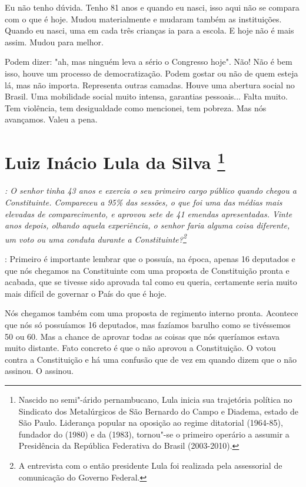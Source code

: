 Eu não tenho dúvida. Tenho 81 anos e quando eu nasci, isso
aqui não se compara com o que é hoje. Mudou materialmente e mudaram
também as instituições. Quando eu nasci, uma em cada três crianças ia
para a escola. E hoje não é mais assim. Mudou para melhor.

Podem dizer: "ah, mas ninguém leva a sério o Congresso hoje". Não! Não é
bem isso, houve um processo de democratização. Podem gostar ou não de
quem esteja lá, mas não importa. Representa outras camadas. Houve uma
abertura social no Brasil. Uma mobilidade social muito intensa,
garantias pessoais... Falta muito. Tem violência, tem desigualdade como
mencionei, tem pobreza. Mas nós avançamos. Valeu a pena.

\chapter{Luiz Inácio Lula da Silva
\footnote{Nascido no semi"-árido pernambucano, Lula inicia sua trajetória política
no Sindicato dos Metalúrgicos de São Bernardo do Campo e Diadema, estado
de São Paulo. Liderança popular na oposição ao regime ditatorial
(1964-85), fundador do  (1980) e da  (1983), tornou"-se o primeiro
operário a assumir a Presidência da República Federativa do Brasil
(2003-2010).}}

\emph{: O senhor tinha 43 anos e exercia o seu primeiro cargo público
quando chegou a Constituinte. Compareceu a 95\% das sessões, o que foi
uma das médias mais elevadas de comparecimento, e aprovou sete de 41
emendas apresentadas. Vinte anos depois, olhando aquela experiência, o
senhor faria alguma coisa diferente, um voto ou uma conduta durante a
Constituinte?\footnote{A entrevista com o então presidente Lula foi realizada pela
assessorial de comunicação do Governo Federal.}}

: Primeiro é importante lembrar que o
 possuía, na época, apenas 16 deputados e que nós chegamos na
Constituinte com uma proposta de Constituição pronta e acabada, que se
tivesse sido aprovada tal como eu queria, certamente seria muito mais
difícil de governar o País do que é hoje.

Nós chegamos também com uma proposta de regimento interno pronta.
Acontece que nós só possuíamos 16 deputados, mas fazíamos barulho como
se tivéssemos 50 ou 60. Mas a chance de aprovar todas as coisas que nós
queríamos estava muito distante. Fato concreto é que o  não aprovou a
Constituição. O  votou contra a Constituição e há uma confusão que de
vez em quando dizem que o  não assinou. O  assinou.

